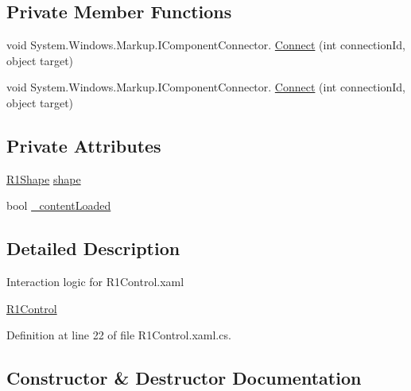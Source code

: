 \subsection*{Private Member Functions}
\begin{DoxyCompactItemize}
\item 
void System.\+Windows.\+Markup.\+I\+Component\+Connector. \hyperlink{class_c_p_u___o_s___simulator_1_1_controls_1_1_resource___controls_1_1_r1_control_a902c8d56ac995e686ba68f9c04b66da8}{Connect} (int connection\+Id, object target)
\item 
void System.\+Windows.\+Markup.\+I\+Component\+Connector. \hyperlink{class_c_p_u___o_s___simulator_1_1_controls_1_1_resource___controls_1_1_r1_control_a902c8d56ac995e686ba68f9c04b66da8}{Connect} (int connection\+Id, object target)
\end{DoxyCompactItemize}
\subsection*{Private Attributes}
\begin{DoxyCompactItemize}
\item 
\hyperlink{class_c_p_u___o_s___simulator_1_1_controls_1_1_resource___controls_1_1_shapes_1_1_r1_shape}{R1\+Shape} \hyperlink{class_c_p_u___o_s___simulator_1_1_controls_1_1_resource___controls_1_1_r1_control_ae8998ab9e64da239c63384534692ea40}{shape}
\item 
bool \hyperlink{class_c_p_u___o_s___simulator_1_1_controls_1_1_resource___controls_1_1_r1_control_a5e0ab124416afee77be606878e73d283}{\+\_\+content\+Loaded}
\end{DoxyCompactItemize}


\subsection{Detailed Description}
Interaction logic for R1\+Control.\+xaml 

\hyperlink{class_c_p_u___o_s___simulator_1_1_controls_1_1_resource___controls_1_1_r1_control}{R1\+Control} 

Definition at line 22 of file R1\+Control.\+xaml.\+cs.



\subsection{Constructor \& Destructor Documentation}
\hypertarget{class_c_p_u___o_s___simulator_1_1_controls_1_1_resource___controls_1_1_r1_control_af02c55b4fcbf6baa5c8f4a49cafaaa84}{}
